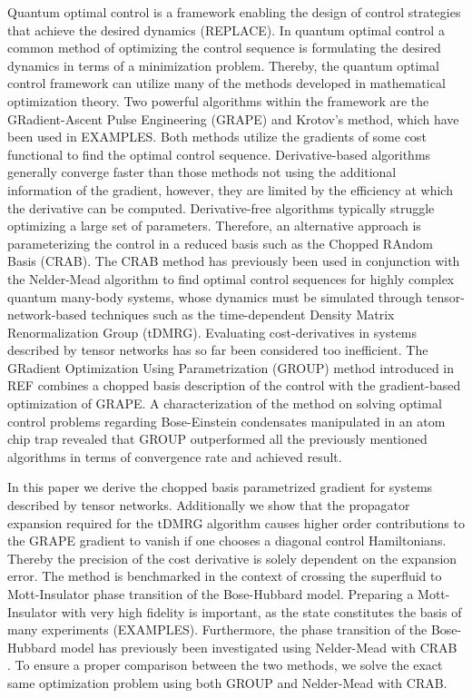 Quantum optimal control is a framework enabling the design of control strategies that achieve the desired dynamics (REPLACE). 
In quantum optimal control a common method of optimizing the control sequence is formulating the desired dynamics in terms of a minimization problem. Thereby, the quantum optimal control framework can utilize many of the methods developed in mathematical optimization theory. Two powerful algorithms within the framework are the GRadient-Ascent Pulse Engineering (GRAPE) and Krotov's method, which have been used in EXAMPLES. Both methods utilize the gradients of some cost functional to find the optimal control sequence. Derivative-based algorithms generally converge faster than those methods not using the additional information of the gradient, however, they are limited by the efficiency at which the derivative can be computed. 
Derivative-free algorithms typically struggle optimizing a large set of parameters. Therefore, an alternative approach is parameterizing the control in a reduced basis such as the Chopped RAndom Basis (CRAB). The CRAB method has previously been used in conjunction with the Nelder-Mead algorithm to find optimal control sequences for highly complex quantum many-body systems, whose dynamics must be simulated through tensor-network-based techniques such as the time-dependent Density Matrix Renormalization Group (tDMRG). Evaluating cost-derivatives in systems described by tensor networks has so far been considered too inefficient.
The GRadient Optimization Using Parametrization (GROUP) method introduced in REF combines a chopped basis description of the control with the gradient-based optimization of GRAPE. A characterization of the method on solving optimal control problems regarding Bose-Einstein condensates manipulated in an atom chip trap revealed that GROUP outperformed all the previously mentioned algorithms in terms of convergence rate and achieved result. 

In this paper we derive the chopped basis parametrized gradient for systems described by tensor networks. Additionally we show that the propagator expansion required for the tDMRG algorithm causes higher order contributions to the GRAPE gradient to vanish if one chooses a diagonal control Hamiltonians. Thereby the precision of the cost derivative is solely dependent on the expansion error.
The method is benchmarked in the context of crossing the superfluid to Mott-Insulator phase transition of the Bose-Hubbard model. Preparing a Mott-Insulator with very high fidelity is important, as the state constitutes the basis of many experiments (EXAMPLES). Furthermore, the phase transition of the Bose-Hubbard model has previously been investigated using Nelder-Mead with CRAB \cite{doria2011optimal,van2016optimal}.
To ensure a proper comparison between the two methods, we solve the exact same optimization problem using both GROUP and Nelder-Mead with CRAB.